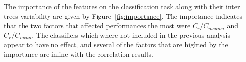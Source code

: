 \documentclass{article}
\begin{document}
\begin{table}[!htbp]
    \begin{center}
    \end{center}
    \caption{Accuracy metrics for random forest models.}
    \label{table:accuracy_random_forest}
\end{table}

The importance of the features on the classification task along with their inter
trees variability are given by Figure~\ref{fig:importance}. The importance
indicates that the two factors that affected performances the most were $C_r /
C_{median}$ and $C_r / C_{mean}$. The classifiers which where not included in
the previous analysis appear to have no effect, and several of the factors that
are highted by the importance are inline with the correlation results.
\end{document}
